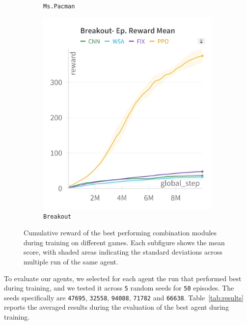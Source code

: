 \begin{figure}[ht]
\begin{subfigure}[b]{0.32\textwidth}
        \caption{\texttt{Ms.Pacman}}
        \label{fig:mspacmantrain}
    \end{subfigure}
    \hfill
    \begin{subfigure}[b]{0.32\textwidth}
        \centering
        \includegraphics[width=\textwidth]{images/breakout_train}
        \caption{\texttt{Breakout}}
        \label{fig:breakouttrain}
    \end{subfigure}
    \caption{Cumulative reward of the best performing combination modules during training on different games. Each subfigure shows the mean score, with shaded areas indicating the standard deviations across multiple run of the same agent.}
    \label{fig:trainresults}
\end{figure}


To evaluate our agents, we selected for each agent the run that performed best during training, and we tested it across \texttt{5} random seeds for \texttt{50} episodes.
The seeds specifically are \texttt{47695}, \texttt{32558}, \texttt{94088}, \texttt{71782} and \texttt{66638}.
Table~\ref{tab:results} reports the averaged results during the evaluation of the best agent during training.

